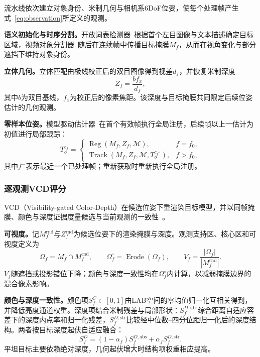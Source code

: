 \documentclass[review]{vgtc}
\begin{document}
流水线依次建立对象身份、米制几何与相机系6DoF位姿，使每个处理帧产生式~\eqref{eq:observation}所定义的观测。

\textbf{语义初始化与时序分割。}开放词表检测器~\cite{yoloe2025}根据首个左目图像与文本描述确定目标区域，视频对象分割器~\cite{cutie2024}随后在连续帧中传播目标掩膜$M_f$，从而在视角变化与部分遮挡下维持对象身份。

\textbf{立体几何。}立体匹配由极线校正后的双目图像得到视差$d_f$，并恢复米制深度
\begin{equation}
Z_f = \frac{b f_x}{d_f},
\label{eq:depth}
\end{equation}
其中$b$为双目基线，$f_x$为校正后的像素焦距。该深度与目标掩膜共同限定后续位姿估计的几何观测。

\textbf{零样本位姿。}模型驱动估计器~\cite{foundationpose2023}在首个有效帧执行全局注册，后续帧以上一估计为初值进行局部跟踪：
\begin{equation}
T_o^{c_f} =
\begin{cases}
\operatorname{Reg}(M_f,Z_f,\mathcal{M}), & f=f_0, \\
\operatorname{Track}(M_f,Z_f,\mathcal{M},T_o^{c_{f^-}}), & f>f_0,
\end{cases}
\label{eq:pose}
\end{equation}
其中$f^-$表示最近一个已处理帧；重新获取时重新执行全局注册。

\subsubsection{逐观测VCD评分}

VCD（Visibility-gated Color-Depth）在候选位姿下重渲染目标模型，并以同帧掩膜、颜色与深度证据度量候选与当前观测的一致性~\cite{cosypose2020,megapose2022}。

\textbf{可视度。}记$M_f^{\mathrm{rnd}}$与$Z_f^{\mathrm{rnd}}$为候选位姿下的渲染掩膜与深度。观测支持区、核心区和可视度定义为
\begin{equation}
\Omega_f=M_f\cap M_f^{\mathrm{rnd}},\qquad
\Omega_f^\circ=\operatorname{Erode}(\Omega_f),\qquad
V_f=\frac{|\Omega_f|}{|M_f^{\mathrm{rnd}}|}.
\label{eq:visibility}
\end{equation}
$V_f$随遮挡或投影错位下降；颜色与深度一致性均在$\Omega_f^\circ$内计算，以减弱掩膜边界的混合像素影响。

\textbf{颜色与深度一致性。}颜色项$S_f^C\in[0,1]$由LAB空间的零均值归一化互相关得到，并降低亮度通道权重。深度项结合米制残差与局部形状：$S_f^{D,\mathrm{abs}}$综合距离自适应容差下的深度内点率和归一化残差，$S_f^{D,\mathrm{str}}$比较经中位数--四分位距归一化后的深度结构。两者按目标深度起伏自适应融合：
\begin{equation}
S_f^D=(1-\alpha_f)S_f^{D,\mathrm{abs}}+\alpha_f S_f^{D,\mathrm{str}}.
\label{eq:depth-score}
\end{equation}
平坦目标主要依赖绝对深度，几何起伏增大时结构项权重相应提高。
\end{document}
